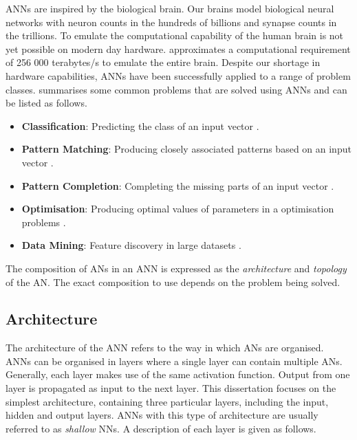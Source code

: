\acp{ANN} are inspired by the biological brain. Our brains model biological neural networks with neuron counts in the hundreds of billions and synapse counts in the trillions. To emulate the computational capability of the human brain is not yet possible on modern day hardware. \citeauthor{ref:sandberg:2008} \cite{ref:sandberg:2008} approximates a computational requirement of 256 000 terabytes/s to emulate the entire brain. Despite our shortage in hardware capabilities, \acp{ANN} have been successfully applied to a range of problem classes. \citeauthor{ref:engelbrecht:2007} \cite{ref:engelbrecht:2007} summarises some common problems that are solved using \acp{ANN} and can be listed as follows.

\begin{itemize}
    \item \textbf{Classification}: Predicting the class of an input vector \cite{ref:khan:2001}.

    \item \textbf{Pattern Matching}: Producing closely associated patterns based on an input vector \cite{ref:cannady:1998, ref:kumar:1994}.

    \item \textbf{Pattern Completion}: Completing the missing parts of an input vector \cite{ref:dayhoff:2001}.

    \item \textbf{Optimisation}: Producing optimal values of parameters in a optimisation problems \cite{ref:specht:1991}.

    \item \textbf{Data Mining}: Feature discovery in large datasets \cite{ref:singh:2009}.
\end{itemize}

\noindent
The composition of \acp{AN} in an \acs{ANN} is expressed as the \textit{architecture} and \textit{topology} of the \acs{AN}. The exact composition to use depends on the problem being solved.

\subsection{Architecture} \label{sec:anns:anns:architecture}

The architecture of the \acs{ANN} refers to the way in which \acp{AN} are organised. \acp{ANN} can be organised in layers where a single layer can contain multiple \acp{AN}. Generally, each layer makes use of the same activation function. Output from one layer is propagated as input to the next layer. This dissertation focuses on the simplest architecture, containing three particular layers, including the input, hidden and output layers. \acp{ANN} with this type of architecture are usually referred to as \textit{shallow} \acp{NN}. A description of each layer is given as follows.

